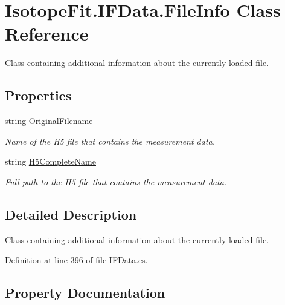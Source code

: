 \hypertarget{class_isotope_fit_1_1_i_f_data_1_1_file_info}{}\section{Isotope\+Fit.\+I\+F\+Data.\+File\+Info Class Reference}
\label{class_isotope_fit_1_1_i_f_data_1_1_file_info}


Class containing additional information about the currently loaded file.  


\subsection*{Properties}
\begin{DoxyCompactItemize}
\item 
string \hyperlink{class_isotope_fit_1_1_i_f_data_1_1_file_info_a465af980a8c2f2a971d213e328b5932c}{Original\+Filename}
\begin{DoxyCompactList}\small\item\em Name of the H5 file that contains the measurement data. \end{DoxyCompactList}\item 
string \hyperlink{class_isotope_fit_1_1_i_f_data_1_1_file_info_a3c352cd3b905abe1210e97cc24be0b88}{H5\+Complete\+Name}
\begin{DoxyCompactList}\small\item\em Full path to the H5 file that contains the measurement data. \end{DoxyCompactList}\end{DoxyCompactItemize}


\subsection{Detailed Description}
Class containing additional information about the currently loaded file. 



Definition at line 396 of file I\+F\+Data.\+cs.



\subsection{Property Documentation}
\mbox{\label{class_isotope_fit_1_1_i_f_data_1_1_file_info_a3c352cd3b905abe1210e97cc24be0b88}} 
